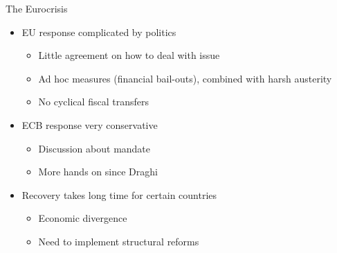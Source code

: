 \documentclass{beamer}
\begin{document}
\begin{frame}{The Eurocrisis}
  \begin{itemize}
    \item EU response complicated by politics
    \begin{itemize}
      \item Little agreement on how to deal with issue
      \item Ad hoc measures (financial bail-outs), combined with harsh austerity
      \item No cyclical fiscal transfers
    \end{itemize}
    \medskip
    \item ECB response very conservative
    \begin{itemize}
      \item Discussion about mandate
      \item More hands on since Draghi
    \end{itemize}
    \medskip
    \item Recovery takes long time for certain countries
    \begin{itemize}
      \item Economic divergence
      \item Need to implement structural reforms
    \end{itemize}
  \end{itemize}
\end{frame}
\end{document}
